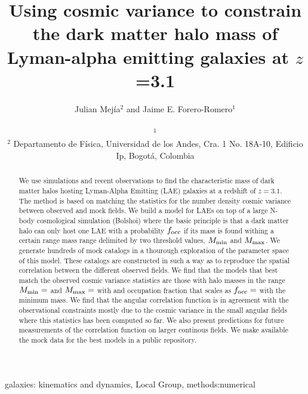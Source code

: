 \documentclass[usenatbib]{mn2e}
\begin{document}
\title[Dark Matter Halo Mass for LAEs  at $z=3.1$]{Using cosmic
  variance to constrain the
  dark matter halo mass of Lyman-alpha emitting galaxies at $z$=3.1}
\author[~J.~E. Forero-Romero and J. Mejia]{
\parbox[t]{\textwidth}{\raggedright 
  Julian Mej\'ia$^{2}$ and
Jaime E. Forero-Romero$^{1}$}
\vspace*{6pt}\\
$^{1}$\\
$^{2}$ Departamento de F\'{i}sica, Universidad de los Andes, Cra. 1
No. 18A-10, Edificio Ip, Bogot\'a, Colombia 
}

\maketitle

\begin{abstract}
We use simulations and recent observations to find the characteristic
mass of dark matter halos hosting Lyman-Alpha Emitting (LAE) galaxies
at a redshift of $z=3.1$. The method is based on matching the
statistics for the number density cosmic variance between observed and
mock fields. We build a model for LAEs on top of a large N-body
cosmological simulation (Bolshoi) where the basic principle is that a
dark matter halo can only host one LAE with a probability $f_{\rm occ}$ if its
mass is found withing a certain range mass range delimited by two
threshold values, $M_{\rm min}$ and $M_{\rm max}$. We generate
hundreds of mock catalogs in a thourough exploration of the parameter
space of this model. These catalogs are constructed in such a way as
to reproduce the spatial correlation between the different observed
fields. We find that the models that best match the observed cosmic
variance statistics are those with halo masses in the range $M_{\rm
  min}=$ and $M_{\rm max}=$ with and occupation fraction that scales
as $f_{\rm occ}=$ with the minimum mass. We find that the angular
correlation function is in agreement with the observational
constraints mostly due to the cosmic variance in the small angular
fields where this statistics has been computed so far. We also present
predictions for future measurements of the correlation function on
larger continous fields. We make available the mock data for the best
models in a public repository.  
\end{abstract}

\begin{keywords}
{galaxies: kinematics and dynamics, Local Group, methods:numerical}
\end{keywords}
\end{document}
